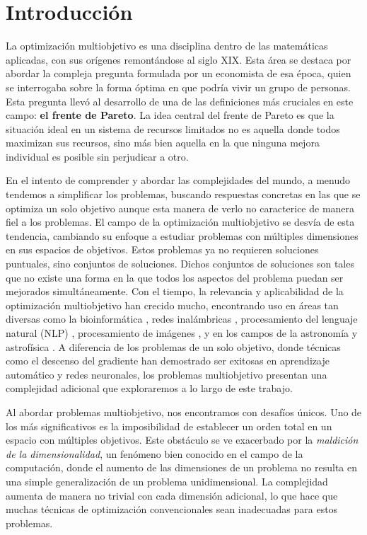 

\chapter{Introducción}


La optimización multiobjetivo es una disciplina dentro de las matemáticas aplicadas, con sus orígenes remontándose al siglo XIX. Esta área se destaca por abordar la compleja pregunta formulada por un economista de esa época, quien se interrogaba sobre la forma óptima en que podría vivir un grupo de personas. Esta pregunta llevó al desarrollo de una de las definiciones más cruciales en este campo: \textbf{el frente de Pareto}. La idea central del frente de Pareto es que la situación ideal en un sistema de recursos limitados no es aquella donde todos maximizan sus recursos, sino más bien aquella en la que ninguna mejora individual es posible sin perjudicar a otro. 

En el intento de comprender y abordar las complejidades del mundo, a menudo tendemos a simplificar los problemas, buscando respuestas concretas en las que se optimiza un solo objetivo aunque esta manera de verlo no caracterice de manera fiel a los problemas. El campo de la optimización multiobjetivo se desvía de esta tendencia, cambiando su enfoque a estudiar problemas con múltiples dimensiones en sus espacios de objetivos. Estos problemas ya no requieren soluciones puntuales, sino conjuntos de soluciones. Dichos conjuntos de soluciones son tales que no existe una forma en la que todos los aspectos del problema puedan ser mejorados simultáneamente. Con el tiempo, la relevancia y aplicabilidad de la optimización multiobjetivo han crecido mucho, encontrando uso en áreas tan diversas como la bioinformática \cite{handlMultiobjectiveOptimizationBioinformatics2007}, redes inalámbricas \cite{gunjanReviewMultiobjectiveOptimization2023}, procesamiento del lenguaje natural (NLP) \cite{sainiMultiobjectiveOptimizationTechniques2021}, procesamiento de imágenes \cite{aslamComprehensiveSurveyOptimization2020}, y en los campos de la astronomía y astrofísica \cite{mullerUsingMultiobjectiveOptimization2023}. A diferencia de los problemas de un solo objetivo, donde técnicas como el descenso del gradiente han demostrado ser exitosas en aprendizaje automático y redes neuronales, los problemas multiobjetivo presentan una complejidad adicional que exploraremos a lo largo de este trabajo.


Al abordar problemas multiobjetivo, nos encontramos con desafíos únicos. Uno de los más significativos es la imposibilidad de establecer un orden total en un espacio con múltiples objetivos.  Este obstáculo se ve exacerbado por la \emph{maldición de la dimensionalidad}, un fenómeno bien conocido en el campo de la computación, donde el aumento de las dimensiones de un problema no resulta en una simple generalización de un problema unidimensional. La complejidad aumenta de manera no trivial con cada dimensión adicional, lo que hace que muchas técnicas de optimización convencionales sean inadecuadas para estos problemas.

